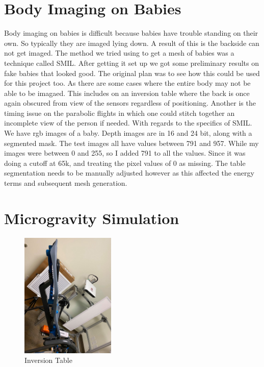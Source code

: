 \section{Body Imaging on Babies}
Body imaging on babies is difficult because babies have trouble standing on their own. So typically they are imaged lying down. A result of this is the backside can not get imaged. The method we tried using to get a mesh of babies was a technique called SMIL\cite{hesse2018learning}. After getting it set up we got some preliminary results on fake babies that looked good. The original plan was to see how this could be used for this project too. As there are some cases where the entire body may not be able to be imagaed. This includes on an inversion table where the back is once again obscured from view of the sensors regardless of positioning. Another is the timing issue on the parabolic flights in which one could stitch together an incomplete view of the person if needed. With regards to the specifics of SMIL. We have rgb images of a baby. Depth images are in 16 and 24 bit, along with a segmented mask. The test images all have values between 791 and 957. While my images were between 0 and 255, so I added 791 to all the values. Since it was doing a cutoff at 65k, and treating the pixel values of 0 as missing. The table segmentation needs to be manually adjusted however as this affected the energy terms and subsequent mesh generation.
\section{Microgravity Simulation}


\begin{figure}[!htb]
	\caption{Inversion Table}
	\centering
	\includegraphics[width=0.4\textwidth]{images/inversion.jpg}
\end{figure}
